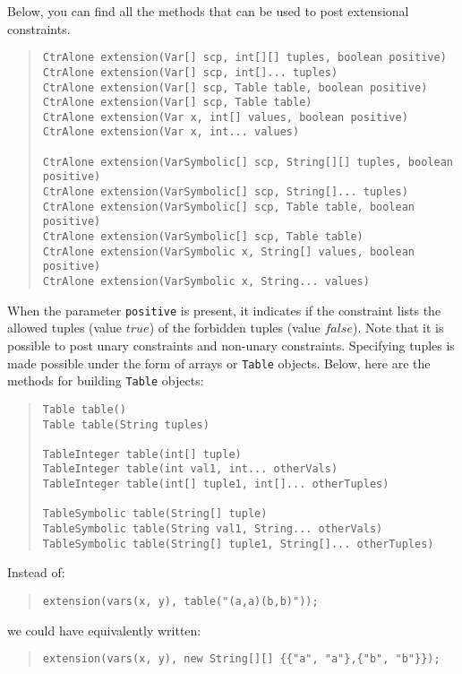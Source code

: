 \documentclass[10pt]{article}
\newcommand{\nn}[1]{{\tt #1}} %
\begin{document}
Below, you can find all the methods that can be used to post extensional constraints.

\begin{quote}
\begin{verbatim}
CtrAlone extension(Var[] scp, int[][] tuples, boolean positive) 
CtrAlone extension(Var[] scp, int[]... tuples) 
CtrAlone extension(Var[] scp, Table table, boolean positive) 
CtrAlone extension(Var[] scp, Table table) 
CtrAlone extension(Var x, int[] values, boolean positive) 
CtrAlone extension(Var x, int... values) 

CtrAlone extension(VarSymbolic[] scp, String[][] tuples, boolean positive) 
CtrAlone extension(VarSymbolic[] scp, String[]... tuples) 
CtrAlone extension(VarSymbolic[] scp, Table table, boolean positive) 
CtrAlone extension(VarSymbolic[] scp, Table table) 
CtrAlone extension(VarSymbolic x, String[] values, boolean positive) 
CtrAlone extension(VarSymbolic x, String... values) 
\end{verbatim}
\end{quote}


When the parameter \nn{positive} is present, it indicates if the constraint lists the allowed tuples (value $true$) of the forbidden tuples (value $false$).
Note that it is possible to post unary constraints and non-unary constraints.
Specifying tuples is made possible under the form of arrays or \nn{Table} objects.
Below, here are the methods for building \nn{Table} objects:

\begin{quote}
\begin{verbatim}
Table table() 
Table table(String tuples)

TableInteger table(int[] tuple) 
TableInteger table(int val1, int... otherVals) 
TableInteger table(int[] tuple1, int[]... otherTuples) 

TableSymbolic table(String[] tuple) 
TableSymbolic table(String val1, String... otherVals) 
TableSymbolic table(String[] tuple1, String[]... otherTuples) 
\end{verbatim}
\end{quote}

Instead of:
\begin{quote}
  \verb!extension(vars(x, y), table("(a,a)(b,b)"));!
\end{quote}
we could have equivalently written:
\begin{quote}
  \verb!extension(vars(x, y), new String[][] {{"a", "a"},{"b", "b"}});!
\end{quote}
\end{document}
